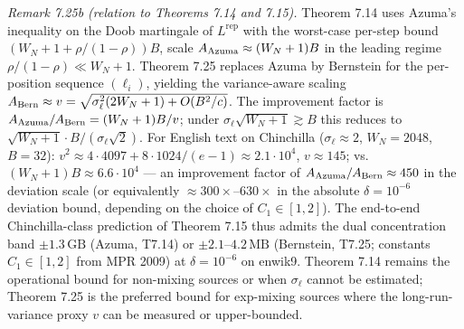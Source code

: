 \documentclass[
]{article}
\begin{document}
\emph{Remark 7.25b (relation to Theorems 7.14 and 7.15).}
Theorem 7.14 uses Azuma's inequality on the Doob martingale of
$L^{\mathrm{rep}}$ with the worst-case per-step bound
$(W_N + 1 + \rho/(1-\rho)) B$, scale $A_{\rm Azuma}
\approx (W_N+1) B$ in the leading regime $\rho/(1-\rho) \ll W_N + 1$.
Theorem 7.25 replaces Azuma by Bernstein for the per-position
sequence $(\ell_i)$, yielding the variance-aware scaling
$A_{\rm Bern} \approx v = \sqrt{\sigma_\ell^2 (2W_N+1)
+ O(B^2/c)}$. The improvement factor is
$A_{\rm Azuma}/A_{\rm Bern} = (W_N+1) B / v$; under
$\sigma_\ell \sqrt{W_N+1} \gtrsim B$ this reduces to $\sqrt{W_N+1}
\cdot B/(\sigma_\ell \sqrt{2})$. For English text on Chinchilla
($\sigma_\ell \approx 2$, $W_N = 2048$, $B = 32$): $v^2 \approx
4 \cdot 4097 + 8 \cdot 1024 / (e-1) \approx 2.1 \cdot 10^4$,
$v \approx 145$; vs.\ $(W_N+1) B \approx 6.6 \cdot 10^4$ --- an
improvement factor of $A_{\rm Azuma}/A_{\rm Bern} \approx 450$
in the deviation scale (or equivalently $\approx 300\times$--$630\times$
in the absolute $\delta = 10^{-6}$ deviation bound, depending on
the choice of $C_1 \in [1, 2]$). The end-to-end
Chinchilla-class prediction of Theorem 7.15 thus admits the dual
concentration band $\pm 1.3\,\mathrm{GB}$ (Azuma, T7.14) or
$\pm 2.1$--$4.2\,\mathrm{MB}$ (Bernstein, T7.25; constants
$C_1 \in [1,2]$ from MPR 2009) at $\delta = 10^{-6}$ on enwik9.
Theorem 7.14 remains the operational bound for non-mixing sources
or when $\sigma_\ell$ cannot be estimated;
Theorem 7.25 is the preferred bound for exp-mixing sources where
the long-run-variance proxy $v$ can be measured or upper-bounded.
\end{document}
